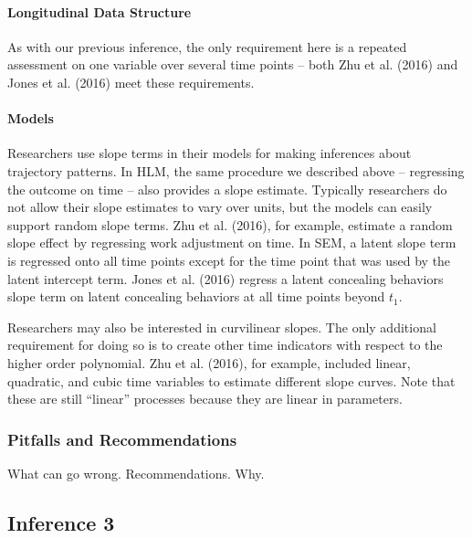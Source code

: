 \documentclass[english,,man]{apa6}
\let\oldparagraph\paragraph
\renewcommand{\paragraph}[1]{\oldparagraph{#1}\mbox{}}
\theoremstyle{definition}
\theoremstyle{definition}
\theoremstyle{definition}
\theoremstyle{remark}
\begin{document}
\hypertarget{longitudinal-data-structure-2}{%
\paragraph{Longitudinal Data
Structure}\label{longitudinal-data-structure-2}}

As with our previous inference, the only requirement here is a repeated
assessment on one variable over several time points -- both Zhu et al.
(2016) and Jones et al. (2016) meet these requirements.

\hypertarget{models-2}{%
\paragraph{Models}\label{models-2}}

Researchers use slope terms in their models for making inferences about
trajectory patterns. In HLM, the same procedure we described above --
regressing the outcome on time -- also provides a slope estimate.
Typically researchers do not allow their slope estimates to vary over
units, but the models can easily support random slope terms. Zhu et al.
(2016), for example, estimate a random slope effect by regressing work
adjustment on time. In SEM, a latent slope term is regressed onto all
time points except for the time point that was used by the latent
intercept term. Jones et al. (2016) regress a latent concealing
behaviors slope term on latent concealing behaviors at all time points
beyond \(t_1\).

Researchers may also be interested in curvilinear slopes. The only
additional requirement for doing so is to create other time indicators
with respect to the higher order polynomial. Zhu et al. (2016), for
example, included linear, quadratic, and cubic time variables to
estimate different slope curves. Note that these are still
\enquote{linear} processes because they are linear in parameters.

\hypertarget{pitfalls-and-recommendations-2}{%
\subsubsection{Pitfalls and
Recommendations}\label{pitfalls-and-recommendations-2}}

What can go wrong. Recommendations. Why.

\hypertarget{inference-3}{%
\subsection{Inference 3}\label{inference-3}}
\end{document}
